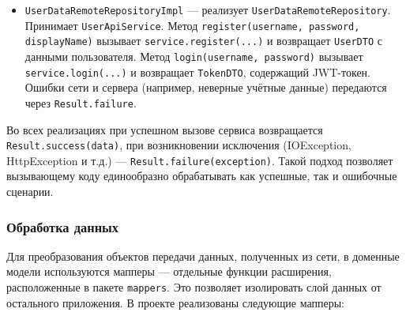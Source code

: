 \begin{itemize}
    \item \texttt{UserDataRemoteRepositoryImpl} — реализует \texttt{UserDataRemoteRepository}. Принимает \texttt{UserApiService}. Метод \texttt{register(username, password, displayName)} вызывает \texttt{service.register(...)} и возвращает \texttt{UserDTO} с данными пользователя. Метод \texttt{login(username, password)} вызывает \texttt{service.login(...)} и возвращает \texttt{TokenDTO}, содержащий JWT-токен. Ошибки сети и сервера (например, неверные учётные данные) передаются через \texttt{Result.failure}.
\end{itemize}

Во всех реализациях при успешном вызове сервиса возвращается \texttt{Result.success(data)}, при возникновении исключения (IOException, HttpException и т.д.) — \texttt{Result.failure(exception)}. Такой подход позволяет вызывающему коду единообразно обрабатывать как успешные, так и ошибочные сценарии.

\subsubsection{Обработка данных}

Для преобразования объектов передачи данных, полученных из сети, в доменные модели используются мапперы — отдельные функции расширения, расположенные в пакете \texttt{mappers}. Это позволяет изолировать слой данных от остального приложения. В проекте реализованы следующие мапперы:

